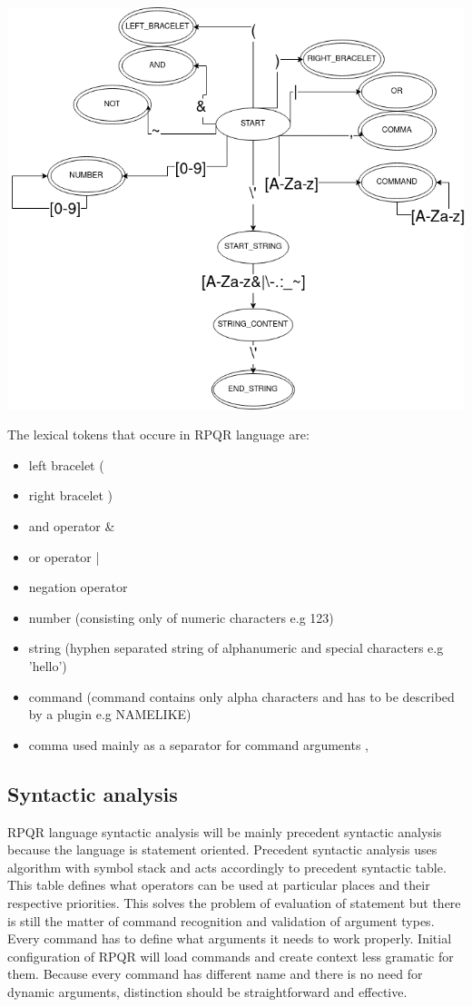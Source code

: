 \includegraphics[scale=0.5]{obrazky-figures/RPQR_FSM.png}

\newpage

The lexical tokens that occure in RPQR language are:
\begin{itemize}
  \item left bracelet (
  \item right bracelet )
  \item and operator \&
  \item or operator |
  \item negation operator ~
  \item number (consisting only of numeric characters e.g 123)
  \item string (hyphen separated string of alphanumeric and special characters e.g 'hello')
  \item command (command contains only alpha characters and has to be described by a plugin e.g NAMELIKE)
  \item comma used mainly as a separator for command arguments ,
\end{itemize}

\subsection*{Syntactic analysis}
RPQR language syntactic analysis will be mainly precedent syntactic analysis because the language is statement
oriented. Precedent syntactic analysis uses algorithm with symbol stack and acts accordingly to precedent
syntactic table. This table defines what operators can be used at particular places and their respective
priorities. This solves the problem of evaluation of statement but there is still the matter of command
recognition and validation of argument types. Every command has to define what arguments it needs to work
properly. Initial configuration of RPQR will load commands and create context less gramatic for them.
Because every command has different name and there is no need for dynamic arguments, distinction should
be straightforward and effective.


